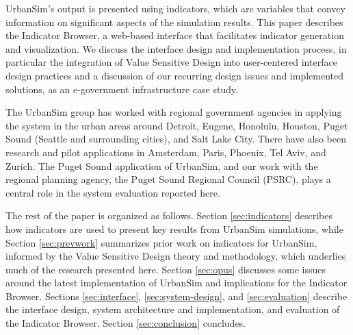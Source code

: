 UrbanSim's output is presented using indicators, which are variables that
convey information on significant aspects of the simulation results. This
paper describes the Indicator Browser, a web-based interface that
facilitates indicator generation and visualization. We discuss the
interface design and implementation process, in particular the integration
of Value Sensitive Design \cite{friedman-amis-2006} into user-centered
interface design practices and a discussion of our recurring design issues
and implemented solutions, as an e-government infrastructure case study.

The UrbanSim group has worked with regional government agencies in applying
the system in the urban areas around Detroit, Eugene, Honolulu, Houston,
Puget Sound (Seattle and surrounding cities), and Salt Lake City.  There
have also been research and pilot applications in Amsterdam, Paris,
Phoenix, Tel Aviv, and Zurich.  The Puget Sound application of UrbanSim,
and our work with the regional planning agency, the Puget Sound Regional
Council (PSRC), plays a central role in the system evaluation reported
here.

The rest of the paper is organized as follows.  Section
\ref{sec:indicators} describes how indicators are used to present key
results from UrbanSim simulations, while Section \ref{sec:prevwork}
summarizes prior work on indicators for UrbanSim, informed by the 
Value Sensitive Design theory and methodology, which underlies much of the
research presented here.  Section \ref{sec:opus} discusses some issues
around the latest implementation of UrbanSim and implications for the
Indicator Browser.  Sections \ref{sec:interface}, \ref{sec:system-design},
and \ref{sec:evaluation} describe the interface design, system architecture
and implementation, and evaluation of the Indicator Browser.  Section
\ref{sec:conclusion} concludes.


